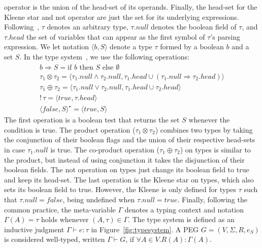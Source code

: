 \documentclass[preprint,12pt]{elsarticle}
\theoremstyle{definition}
\begin{document}
operator is the union of the head-set of its operands. Finally, the head-set
for the Kleene star and not operator are just the set for its underlying expressions.
Following~\cite{Ribeiro19}, $\tau$ denotes an arbitrary type, $\tau.null$
denotes the boolean field of $\tau$, and $\tau.head$ the set of
variables that can appear as the first symbol of $\tau$'s parsing expression.
We let notation $\langle b , S \rangle$ denote a type $\tau$ formed by a
boolean $b$ and a set $S$. In the type system~\cite{Ribeiro19}, we use the following operations:
\[
  \begin{array}{l}
    b \Rightarrow S = \text{if } b \text{ then } S \text{ else }\emptyset\\
    \tau_1 \otimes \tau_2 = \langle \tau_1.null \land \tau_2.null,
                                \tau_1.head \cup (\tau_1.null \Rightarrow \tau_2.head) \rangle \\
    \tau_1 \oplus \tau_2 = \langle \tau_1.null \lor \tau_2.null,
                                \tau_1.head \cup \tau_2.head\rangle\\
    !\,\tau = \langle true , \tau.head \rangle\\
    \langle false, S \rangle^\star = \langle true, S \rangle
  \end{array}
\]
The first operation is a boolean test that returns the set $S$
whenever the condition is true. The product operation ($\tau_1 \otimes \tau_2$) combines two
types by taking the conjunction of their boolean flags and the union of their respective
head-sets in case $\tau_1.null$ is true. The co-product operation ($\tau_1 \oplus \tau_2$) on types is similar to the
product, but instead of using conjunction it takes the disjunction of their boolean fields.
The not operation on types just change its boolean field to true and keep its head-set.
The last operation is the Kleene star on types, which also sets its boolean field to true.
However, the Kleene is only defined for types $\tau$ such that $\tau.null = false$, being
undefined when $\tau.null = true$. Finally, following the common practice, the meta-variable
$\Gamma$ denotes a typing context and notation $\Gamma(A) = \tau$ holds whenever
$(A,\tau) \in \Gamma$.
The type system is defined as an inductive judgment
$\Gamma \vdash e : \tau$ in Figure~\ref{fig:typesystem}. A
PEG $G = (V,\Sigma,R,e_S)$ is considered well-typed, written $\Gamma \vdash G$,
if $\forall A \in V . R(A) : \Gamma (A)$.
\end{document}
